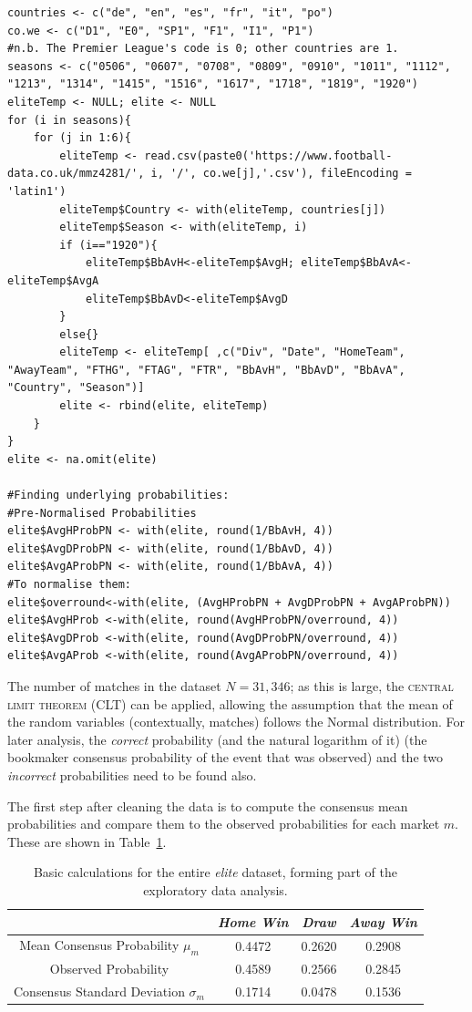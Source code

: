 \documentclass[a4paper,10pt]{report}
\begin{document}
\begin{lstlisting}
countries <- c("de", "en", "es", "fr", "it", "po")
co.we <- c("D1", "E0", "SP1", "F1", "I1", "P1") 
#n.b. The Premier League's code is 0; other countries are 1.
seasons <- c("0506", "0607", "0708", "0809", "0910", "1011", "1112", "1213", "1314", "1415", "1516", "1617", "1718", "1819", "1920")
eliteTemp <- NULL; elite <- NULL
for (i in seasons){
	for (j in 1:6){
		eliteTemp <- read.csv(paste0('https://www.football-data.co.uk/mmz4281/', i, '/', co.we[j],'.csv'), fileEncoding = 'latin1')
		eliteTemp$Country <- with(eliteTemp, countries[j])
		eliteTemp$Season <- with(eliteTemp, i)
		if (i=="1920"){
			eliteTemp$BbAvH<-eliteTemp$AvgH; eliteTemp$BbAvA<-eliteTemp$AvgA
			eliteTemp$BbAvD<-eliteTemp$AvgD
		}
		else{}
		eliteTemp <- eliteTemp[ ,c("Div", "Date", "HomeTeam", "AwayTeam", "FTHG", "FTAG", "FTR", "BbAvH", "BbAvD", "BbAvA", "Country", "Season")]
		elite <- rbind(elite, eliteTemp)
	}
}
elite <- na.omit(elite)

#Finding underlying probabilities: 
#Pre-Normalised Probabilities
elite$AvgHProbPN <- with(elite, round(1/BbAvH, 4)) 
elite$AvgDProbPN <- with(elite, round(1/BbAvD, 4))
elite$AvgAProbPN <- with(elite, round(1/BbAvA, 4))
#To normalise them:
elite$overround<-with(elite, (AvgHProbPN + AvgDProbPN + AvgAProbPN))
elite$AvgHProb <-with(elite, round(AvgHProbPN/overround, 4))
elite$AvgDProb <-with(elite, round(AvgDProbPN/overround, 4))
elite$AvgAProb <-with(elite, round(AvgAProbPN/overround, 4))
\end{lstlisting}

The number of matches in the dataset $N = 31,346$; as this is large, the \textsc{central limit theorem} (CLT) can be applied, allowing the assumption that the mean of the random variables (contextually, matches) follows the Normal distribution. For later analysis, the \textit{correct} probability (and the natural logarithm of it) (the bookmaker consensus probability of the event that was observed) and the two \textit{incorrect} probabilities need to be found also.

The first step after cleaning the data is to compute the consensus mean probabilities and compare them to the observed probabilities for each market $m$. These are shown in Table~\ref{tab:edaelitecalcs}.\vspace{3mm}

\begin{table}[h!]\begin{center}\begin{tabular}[h!]{c||c|c|c}
	& \textit{Home Win} & \textit{Draw} & \textit{Away Win} \\\hline\hline
	Mean Consensus Probability $\mu_m$ & 0.4472 & 0.2620 & 0.2908 \\
	Observed Probability& 0.4589&0.2566 & 0.2845\\\hline
	Consensus Standard Deviation $\sigma_m$&0.1714&0.0478&0.1536
\end{tabular}\end{center} \caption{Basic calculations for the entire \textit{elite} dataset, forming part of the exploratory data analysis.} \label{tab:edaelitecalcs}\end{table}
\end{document}
